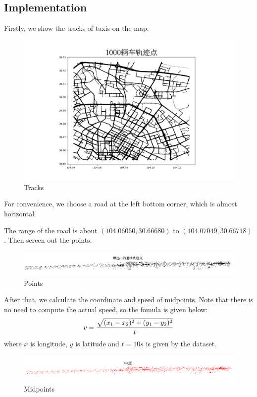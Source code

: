 \documentclass[fontset=none]{ctexart}
\theoremstyle{definition}
\theoremstyle{remark}
\begin{document}
\clearpage
\subsection{Implementation}
Firstly, we show the tracks of taxis on the map:
\begin{figure}[htb]
  \centering
  \includegraphics[width=\textwidth]{images/1000辆车轨迹点.png}
  \caption{Tracks}
  \label{fig: tracks}
\end{figure}

For convenience, we choose a road at the left bottom corner, which is almost horizontal.

The range of the road is about $(104.06060, 30.66680)$ to $(104.07049, 30.66718)$.
Then screen out the points.
\begin{figure}[htb]
  \centering
  \includegraphics[width=\textwidth]{images/temp.png}
  \caption{Points}
  \label{fig: points}
\end{figure}

After that, we calculate the coordinate and speed of midpoints.
Note that there is no need to compute the actual speed, so the fomula is given below:
\begin{equation}
  v=\frac{\sqrt{(x_1-x_2)^2+(y_1-y_2)^2}}{t}
  \notag
\end{equation}
where $x$ is longitude, $y$ is latitude and $t=10s$ is given by the dataset.
\begin{figure}[htb]
  \centering
  \includegraphics[width=\textwidth]{images/1000辆车中点.png}
  \caption{Midpoints}
  \label{fig: Midpoints}
\end{figure}
\end{document}
